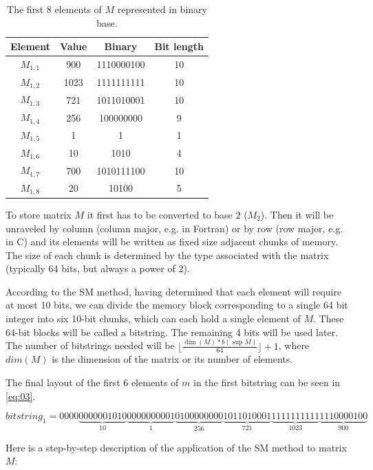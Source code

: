 \documentclass[10pt]{article}
\begin{document}
\begin{table}[h]
 \centering
 \caption{The first 8 elements of $M$ represented in binary base.}
 \begin{tabular}{cccc} 
  \hline 
  Element & Value  & Binary & Bit length\\
  \hline
  $M_{1,1}$ & 900  & 1110000100 & 10\\
  $M_{1,2}$ & 1023 & 1111111111 & 10\\
  $M_{1,3}$ & 721  & 1011010001 & 10\\
  $M_{1,4}$ & 256  & 100000000  & 9\\
  $M_{1,5}$ & 1    & 1          & 1\\
  $M_{1,6}$ & 10   & 1010       & 4\\
  $M_{1,7}$ & 700  & 1010111100 & 10\\
  $M_{1,8}$ & 20   & 10100      & 5\\
  \hline
 \end{tabular}
 \label{tab:01}
\end{table}

To store matrix $M$ it first has to be converted to base $2$ ($M_2$). Then it 
will be unraveled by column (column major, e.g. in Fortran) or by row (row 
major, e.g. in C) and its elements will be written as fixed size adjacent chunks 
of memory. The size of each chunk is determined by the type associated with the 
matrix (typically 64 bits, but always a power of 2).

According to the SM method, having determined that each element will require at 
most 10 bits, we can divide the memory block corresponding to a single 64 bit 
integer into six 10-bit chunks, which can each hold a single element of $M$. 
These 64-bit blocks will be called a bitstring. The remaining 4 bits will be 
used later. The number of bitstrings needed will be $\lfloor \frac{\dim(M) 
*b(\sup M)} {64} \rfloor +1$, where $dim(M)$ is the dimension of the matrix or 
its number of elements.

The final layout of the first 6 elements of $m$ in the first bitstring can be seen in \ref{eq:03}.

\begin{equation}\label{eq:03}
 bitstring_1 = 0000\underbrace{0000001010}_{10}\underbrace{0000000001}_{1}\underbrace{0100000000}_{256}\underbrace{1011010001}_{721}\underbrace{1111111111}_{1023}\underbrace{1110000100}_{900} 
\end{equation}

Here is a step-by-step description of the application of the SM method to matrix $M$:
\end{document}
